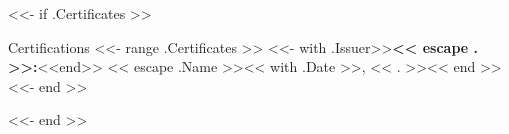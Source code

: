 \documentclass{resume}
\begin{document}
<<- if .Certificates >>
\begin{rSection}{Certifications}
<<- range .Certificates >>
  <<- with .Issuer>>{\bf << escape . >>:}<<end>> << escape .Name >><< with .Date >>, << . >><< end >>\\[0.5em]
<<- end >>
\end{rSection}
<<- end >>
\end{document}
